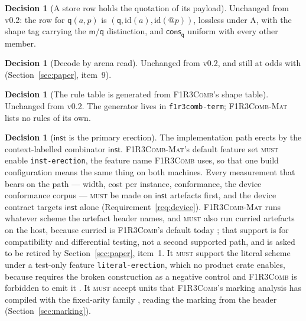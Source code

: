 \documentclass[11pt,a4paper]{article}
\makeatletter
\newcommand{\code}[1]{\texttt{#1}}
\newcommand{\Comb}{\textsc{F1R3Comb}}
\newcommand{\Mat}{\textsc{F1R3Comb-Mat}}
\newcommand{\MUST}{\textsc{must}}
\newcommand{\quo}[1]{@#1}
\newcommand{\mm}{\mathsf{m}}
\newcommand{\qq}{\mathsf{q}}
\newcommand{\cons}{\mathsf{cons}}
\theoremstyle{definition}
\newtheorem{decision}[definition]{Decision}
\theoremstyle{plain}
\newcommand{\inst}{\mathsf{inst}}
\makeatother
\begin{document}
\begin{decision}[A store row holds the quotation of its payload]
\label{dec:qrow}
Unchanged from v0.2: the row for $\qq(a,p)$ is
$(\qq,\mathrm{id}(a),\mathrm{id}(\quo{p}))$, lossless under A, with the shape
tag carrying the $\mm$/$\qq$ distinction, and $\cons_{\qq}$ uniform with every
other member.
\end{decision}

\begin{decision}[Decode by arena read]\label{dec:decode}
Unchanged from v0.2, and still at odds with \cite[Req.~9.3]{combspec}
(Section~\ref{sec:paper}, item~9).
\end{decision}

\begin{decision}[The rule table is generated from \Comb's shape table]
\label{dec:ruletable}
Unchanged from v0.2. The generator lives in \code{f1r3comb-term}; \Mat{} lists
no rules of its own.
\end{decision}

\begin{decision}[$\inst$ is the primary erection]\label{dec:schemes}
The implementation path erects by the context-labelled combinator $\inst$.
\Mat{}'s default feature set \MUST{} enable \code{inst-erection}, the feature
name \Comb{} uses, so that one build configuration means the same thing on
both machines. Every measurement that bears on the path --- width, cost per
instance, conformance, the device conformance corpus --- \MUST{} be made on
$\inst$ artefacts first, and the device contract targets $\inst$ alone
(Requirement~\ref{req:device}). \Mat{} runs whatever scheme the artefact
header names, and \MUST{} also run curried artefacts on the host, because
curried is \Comb's default today \cite[Dec.~5.19]{combspec}; that support is
for compatibility and differential testing, not a second supported path, and
is asked to be retired by Section~\ref{sec:paper}, item~1. It \MUST{} support the
literal scheme under a test-only feature \code{literal-erection}, which no
product crate enables, because \cite[Obl.~11.3]{combspec} requires the broken
construction as a negative control and \Comb{} is forbidden to emit it
\cite[Req.~5.15]{combspec}. It \MUST{} accept units that \Comb's marking
analysis has compiled with the fixed-arity family \cite[Req.~5.17]{combspec},
reading the marking from the header (Section~\ref{sec:marking}).
\end{decision}
\end{document}
